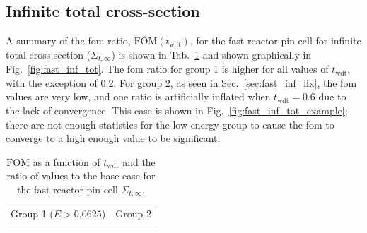 \subsection{Infinite total cross-section}
\label{sec:fast_inf_tot_cross_section}
A summary of the \gls{fom} ratio,
$\overline{\mathrm{FOM}}(t_{\mathrm{wdt}})$, for the fast reactor pin
cell for infinite total cross-section ($\Sigma_{t,
  \infty}$) is shown in Tab.~\ref{tab:fast_inf_tot} and shown
graphically in Fig.~\ref{fig:fast_inf_tot}. The \gls{fom} ratio for
group 1 is higher for all values of $t_{\mathrm{wdt}}$, with the
exception of 0.2. For group 2, as seen in Sec.~\ref{sec:fast_inf_flx}, the
\gls{fom} values are very low, and one ratio is artificially inflated
when $t_{\mathrm{wdt}} = 0.6$
due to the lack of convergence. This case is shown in
Fig.~\ref{fig:fast_inf_tot_example}; there are not enough statistics
for the low energy group to cause the \gls{fom} to converge to a high
enough value to be significant.
\begin{table}[hbtp]
  \centering
  \caption[$\overline{\mathrm{FOM}}$ and ratio for
    the fast reactor pin cell $\Sigma_{t,\infty}$.]{$\overline{\mathrm{FOM}}$ as a function of
    $t_{\mathrm{wdt}}$ and the ratio of values to the base case for
    the fast reactor pin cell $\Sigma_{t,\infty}$.}
  \begin{tabular}{cc} Group 1 ($E > 0.0625$) & Group 2 \\
    
 &
   
  \end{tabular}
\label{tab:fast_inf_tot}
\end{table}

